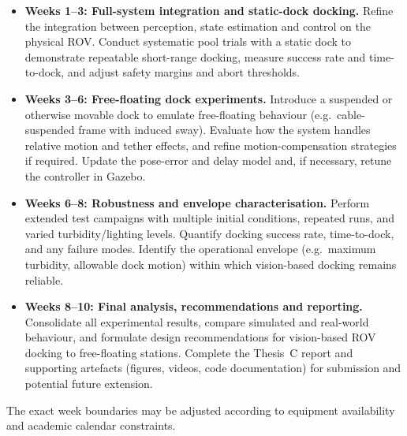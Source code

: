 \begin{itemize}
    \item \textbf{Weeks 1--3: Full-system integration and static-dock docking.}
          Refine the integration between perception, state estimation and control on the physical ROV. Conduct systematic pool trials with a static dock to demonstrate repeatable short-range docking, measure success rate and time-to-dock, and adjust safety margins and abort thresholds.

    \item \textbf{Weeks 3--6: Free-floating dock experiments.}
          Introduce a suspended or otherwise movable dock to emulate free-floating behaviour (e.g.\ cable-suspended frame with induced sway). Evaluate how the system handles relative motion and tether effects, and refine motion-compensation strategies if required. Update the pose-error and delay model and, if necessary, retune the controller in Gazebo.

    \item \textbf{Weeks 6--8: Robustness and envelope characterisation.}
          Perform extended test campaigns with multiple initial conditions, repeated runs, and varied turbidity/lighting levels. Quantify docking success rate, time-to-dock, and any failure modes. Identify the operational envelope (e.g.\ maximum turbidity, allowable dock motion) within which vision-based docking remains reliable.

    \item \textbf{Weeks 8--10: Final analysis, recommendations and reporting.}
          Consolidate all experimental results, compare simulated and real-world behaviour, and formulate design recommendations for vision-based ROV docking to free-floating stations. Complete the Thesis~C report and supporting artefacts (figures, videos, code documentation) for submission and potential future extension.
\end{itemize}

The exact week boundaries may be adjusted according to equipment availability and academic calendar constraints.